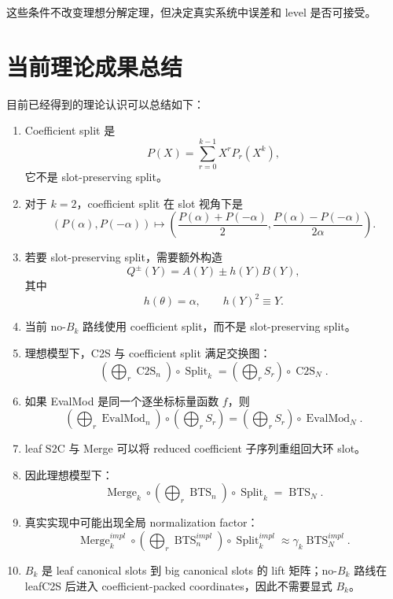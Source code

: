 \documentclass[UTF8,11pt]{ctexart}
\theoremstyle{definition}
\newcommand{\CtwoS}{\operatorname{C2S}}
\newcommand{\BTS}{\operatorname{BTS}}
\newcommand{\Split}{\operatorname{Split}}
\newcommand{\Merge}{\operatorname{Merge}}
\newcommand{\EvalMod}{\operatorname{EvalMod}}
\begin{document}
这些条件不改变理想分解定理，但决定真实系统中误差和 level 是否可接受。

\section{当前理论成果总结}

目前已经得到的理论认识可以总结如下：

\begin{enumerate}[label=(\arabic*)]
    \item Coefficient split 是
    \[
    P(X)=\sum_{r=0}^{k-1}X^rP_r(X^k),
    \]
    它不是 slot-preserving split。
    
    \item 对于 \(k=2\)，coefficient split 在 slot 视角下是
    \[
    (P(\alpha),P(-\alpha))
    \mapsto
    \left(
    \frac{P(\alpha)+P(-\alpha)}{2},
    \frac{P(\alpha)-P(-\alpha)}{2\alpha}
    \right).
    \]
    
    \item 若要 slot-preserving split，需要额外构造
    \[
    Q^\pm(Y)=A(Y)\pm h(Y)B(Y),
    \]
    其中
    \[
    h(\theta)=\alpha,\qquad h(Y)^2\equiv Y.
    \]
    
    \item 当前 no-\(B_k\) 路线使用 coefficient split，而不是 slot-preserving split。
    
    \item 理想模型下，C2S 与 coefficient split 满足交换图：
    \[
    \left(\bigoplus_r\CtwoS_n\right)\circ\Split_k
    =
    \left(\bigoplus_rS_r\right)\circ\CtwoS_N.
    \]
    
    \item 如果 EvalMod 是同一个逐坐标标量函数 \(f\)，则
    \[
    \left(\bigoplus_r\EvalMod_n\right)
    \circ
    \left(\bigoplus_rS_r\right)
    =
    \left(\bigoplus_rS_r\right)
    \circ
    \EvalMod_N.
    \]
    
    \item leaf S2C 与 Merge 可以将 reduced coefficient 子序列重组回大环 slot。
    
    \item 因此理想模型下：
    \[
    \Merge_k
    \circ
    \left(
    \bigoplus_r\BTS_n
    \right)
    \circ
    \Split_k
    =
    \BTS_N.
    \]
    
    \item 真实实现中可能出现全局 normalization factor：
    \[
    \Merge_k^{impl}
    \circ
    \left(
    \bigoplus_r\BTS_n^{impl}
    \right)
    \circ
    \Split_k^{impl}
    \approx
    \gamma_k\BTS_N^{impl}.
    \]
    
    \item \(B_k\) 是 leaf canonical slots 到 big canonical slots 的 lift 矩阵；no-\(B_k\) 路线在 leafC2S 后进入 coefficient-packed coordinates，因此不需要显式 \(B_k\)。
\end{enumerate}
\end{document}
